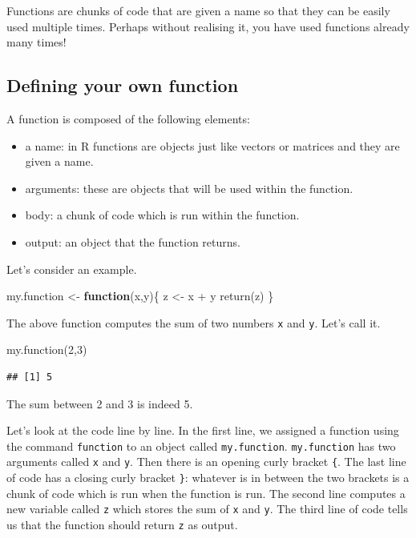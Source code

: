 \documentclass[
]{book}
\newenvironment{Shaded}{\begin{snugshade}}{\end{snugshade}}
\newcommand{\ControlFlowTok}[1]{\textcolor[rgb]{0.13,0.29,0.53}{\textbf{#1}}}
\newcommand{\DecValTok}[1]{\textcolor[rgb]{0.00,0.00,0.81}{#1}}
\newcommand{\FunctionTok}[1]{\textcolor[rgb]{0.00,0.00,0.00}{#1}}
\newcommand{\NormalTok}[1]{#1}
\newcommand{\OtherTok}[1]{\textcolor[rgb]{0.56,0.35,0.01}{#1}}
\newcommand{\SpecialCharTok}[1]{\textcolor[rgb]{0.00,0.00,0.00}{#1}}
\begin{document}
Functions are chunks of code that are given a name so that they can be easily used multiple times. Perhaps without realising it, you have used functions already many times!

\hypertarget{defining-your-own-function}{%
\subsection{Defining your own function}\label{defining-your-own-function}}

A function is composed of the following elements:

\begin{itemize}
\item
  a name: in R functions are objects just like vectors or matrices and they are given a name.
\item
  arguments: these are objects that will be used within the function.
\item
  body: a chunk of code which is run within the function.
\item
  output: an object that the function returns.
\end{itemize}

Let's consider an example.

\begin{Shaded}
\begin{Highlighting}[]
\NormalTok{my.function }\OtherTok{\textless{}{-}} \ControlFlowTok{function}\NormalTok{(x,y)\{}
\NormalTok{  z }\OtherTok{\textless{}{-}}\NormalTok{ x }\SpecialCharTok{+}\NormalTok{ y}
  \FunctionTok{return}\NormalTok{(z)}
\NormalTok{\}}
\end{Highlighting}
\end{Shaded}

The above function computes the sum of two numbers \texttt{x} and \texttt{y}. Let's call it.

\begin{Shaded}
\begin{Highlighting}[]
\FunctionTok{my.function}\NormalTok{(}\DecValTok{2}\NormalTok{,}\DecValTok{3}\NormalTok{)}
\end{Highlighting}
\end{Shaded}

\begin{verbatim}
## [1] 5
\end{verbatim}

The sum between 2 and 3 is indeed 5.

Let's look at the code line by line. In the first line, we assigned a function using the command \texttt{function} to an object called \texttt{my.function}. \texttt{my.function} has two arguments called \texttt{x} and \texttt{y}. Then there is an opening curly bracket \texttt{\{}. The last line of code has a closing curly bracket \texttt{\}}: whatever is in between the two brackets is a chunk of code which is run when the function is run. The second line computes a new variable called \texttt{z} which stores the sum of \texttt{x} and \texttt{y}. The third line of code tells us that the function should return \texttt{z} as output.
\end{document}
